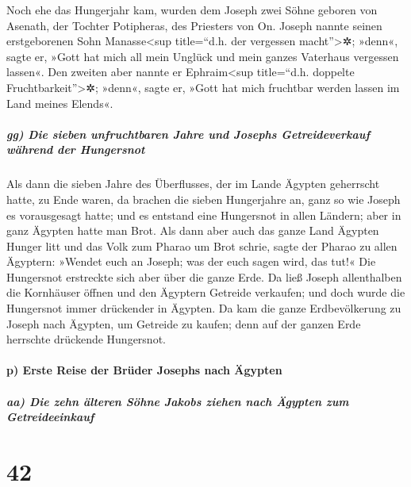  Noch ehe das Hungerjahr kam, wurden dem Joseph zwei
Söhne geboren von Asenath, der Tochter Potipheras, des Priesters von On.
 Joseph nannte seinen erstgeborenen Sohn
Manasse\textless sup title=``d.h. der vergessen macht''\textgreater✲;
»denn«, sagte er, »Gott hat mich all mein Unglück und mein ganzes
Vaterhaus vergessen lassen«.  Den zweiten aber nannte er
Ephraim\textless sup title=``d.h. doppelte Fruchtbarkeit''\textgreater✲;
»denn«, sagte er, »Gott hat mich fruchtbar werden lassen im Land meines
Elends«.

\hypertarget{gg-die-sieben-unfruchtbaren-jahre-und-josephs-getreideverkauf-wuxe4hrend-der-hungersnot}{%
\subparagraph{gg) Die sieben unfruchtbaren Jahre und Josephs
Getreideverkauf während der
Hungersnot}\label{gg-die-sieben-unfruchtbaren-jahre-und-josephs-getreideverkauf-wuxe4hrend-der-hungersnot}}

 Als dann die sieben Jahre des Überflusses, der im Lande
Ägypten geherrscht hatte, zu Ende waren,  da brachen die
sieben Hungerjahre an, ganz so wie Joseph es vorausgesagt hatte; und es
entstand eine Hungersnot in allen Ländern; aber in ganz Ägypten hatte
man Brot.  Als dann aber auch das ganze Land Ägypten
Hunger litt und das Volk zum Pharao um Brot schrie, sagte der Pharao zu
allen Ägyptern: »Wendet euch an Joseph; was der euch sagen wird, das
tut!«  Die Hungersnot erstreckte sich aber über die ganze
Erde. Da ließ Joseph allenthalben die Kornhäuser öffnen und den Ägyptern
Getreide verkaufen; und doch wurde die Hungersnot immer drückender in
Ägypten.  Da kam die ganze Erdbevölkerung zu Joseph nach
Ägypten, um Getreide zu kaufen; denn auf der ganzen Erde herrschte
drückende Hungersnot.

\hypertarget{p-erste-reise-der-bruxfcder-josephs-nach-uxe4gypten}{%
\paragraph{p) Erste Reise der Brüder Josephs nach
Ägypten}\label{p-erste-reise-der-bruxfcder-josephs-nach-uxe4gypten}}

\hypertarget{aa-die-zehn-uxe4lteren-suxf6hne-jakobs-ziehen-nach-uxe4gypten-zum-getreideeinkauf}{%
\subparagraph{aa) Die zehn älteren Söhne Jakobs ziehen nach Ägypten zum
Getreideeinkauf}\label{aa-die-zehn-uxe4lteren-suxf6hne-jakobs-ziehen-nach-uxe4gypten-zum-getreideeinkauf}}

\hypertarget{section-41}{%
\section{42}\label{section-41}}

